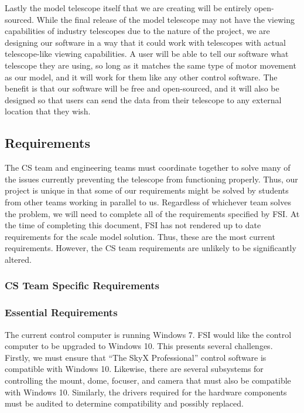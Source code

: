 \documentclass[12pt]{report}
\begin{document}
Lastly the model telescope itself that we are creating will be entirely open-sourced. While the final release of the model telescope may not have the viewing capabilities of industry telescopes due to the nature of the project, we are designing our software in a way that it could work with telescopes with actual telescope-like viewing capabilities. A user will be able to tell our software what telescope they are using, so long as it matches the same type of motor movement as our model, and it will work for them like any other control software. The benefit is that our software will be free and open-sourced, and it will also be designed so that users can send the data from their telescope to any external location that they wish. 

\subsection*{Requirements}

The CS team and engineering teams must coordinate together to solve many of the issues currently preventing the telescope from functioning properly. Thus, our project is unique in that some of our requirements might be solved by students from other teams working in parallel to us. Regardless of whichever team solves the problem, we will need to complete all of the requirements specified by FSI.
At the time of completing this document, FSI has not rendered up to date requirements for the scale model solution. Thus, these are the most current requirements. However, the CS team requirements are unlikely to be significantly altered.

\subsubsection*{CS Team Specific Requirements}

\subsubsection*{Essential Requirements}

The current control computer is running Windows 7. FSI would like the control computer to be upgraded to Windows 10. This presents several challenges. Firstly, we must ensure that “The SkyX Professional” control software is compatible with Windows 10. Likewise, there are several subsystems for controlling the mount, dome, focuser, and camera that must also be compatible with Windows 10. Similarly, the drivers required for the hardware components must be audited to determine compatibility and possibly replaced.
\end{document}
